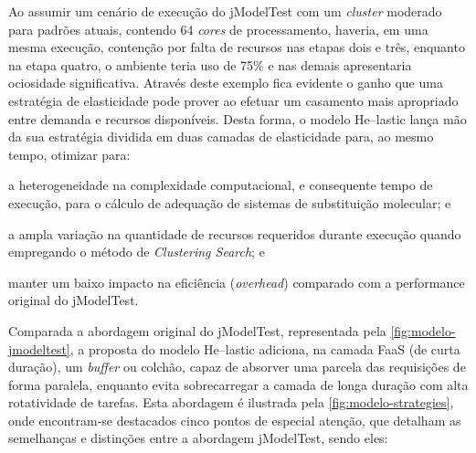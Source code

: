 \documentclass[english,brazilian]{UNISINOSmonografia} %
\begin{document}
Ao assumir um cenário de execução do jModelTest com um \textit{cluster} moderado para padrões atuais, contendo 64 \textit{cores} de processamento, haveria, em uma mesma execução, contenção por falta de recursos nas etapas dois e três, enquanto na etapa quatro, o ambiente teria uso de 75\% e nas demais apresentaria ociosidade significativa.
Através deste exemplo fica evidente o ganho que uma estratégia de elasticidade pode prover ao efetuar um casamento mais apropriado entre demanda e recursos disponíveis.
Desta forma, o modelo \textsf{He}--lastic lança mão da sua estratégia dividida em duas camadas de elasticidade para, ao mesmo tempo, otimizar para:
\begin{inparaenum} 
	\item a heterogeneidade na complexidade computacional, e consequente tempo de execução, para o cálculo de adequação de sistemas de substituição molecular; e
	\item a ampla variação na quantidade de recursos requeridos durante execução quando empregando o método de \textit{Clustering Search}; e
	\item manter um baixo impacto na eficiência (\textit{overhead}) comparado com a performance original do jModelTest. 
\end{inparaenum}


Comparada a abordagem original do jModelTest, representada pela \autoref{fig:modelo-jmodeltest}, a proposta do modelo \textsf{He}--lastic adiciona, na camada FaaS (de curta duração), um \textit{buffer} ou colchão, capaz de absorver uma parcela das requisições de forma paralela, enquanto evita sobrecarregar a camada de longa duração com alta rotatividade de tarefas.
Esta abordagem é ilustrada pela \autoref{fig:modelo-strategies}, onde encontram-se destacados cinco pontos de especial atenção, que detalham as semelhanças e distinções entre a abordagem jModelTest, sendo eles:
\end{document}
